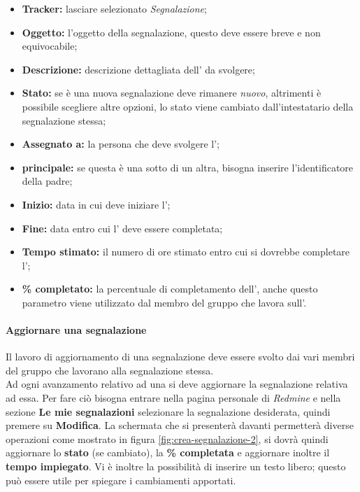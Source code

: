 \documentclass{scalatekids-article}
\begin{document}
\begin{itemize}
\item \textbf{Tracker:} lasciare selezionato \textit{Segnalazione};
\item \textbf{Oggetto:} l'oggetto della segnalazione, questo deve essere breve e non equivocabile;
\item \textbf{Descrizione:} descrizione dettagliata dell' da svolgere;
\item \textbf{Stato:} se è una nuova segnalazione deve rimanere \textit{nuovo}, altrimenti è possibile scegliere altre opzioni, lo stato viene cambiato dall'intestatario della segnalazione stessa;
\item \textbf{Assegnato a:} la persona che deve svolgere l';
\item \textbf{ principale:} se questa è una sotto  di un altra, bisogna inserire l'identificatore della  padre;
\item \textbf{Inizio:} data in cui deve iniziare l';
\item \textbf{Fine:} data entro cui l' deve essere completata;
\item \textbf{Tempo stimato:} il numero di ore stimato entro cui si dovrebbe completare l';
\item \textbf{\% completato:} la percentuale di completamento dell', anche questo parametro viene utilizzato dal membro del gruppo che lavora sull'.
\end{itemize}
\paragraph{Aggiornare una segnalazione}
Il lavoro di aggiornamento di una segnalazione deve essere svolto dai vari
membri del gruppo che lavorano alla segnalazione stessa.\\ Ad ogni avanzamento
relativo ad una  si deve aggiornare la segnalazione relativa ad
essa. Per fare ciò bisogna entrare nella pagina personale di \textit{Redmine} e
nella sezione \textbf{Le mie segnalazioni} selezionare la segnalazione
desiderata, quindi premere su \textbf{Modifica}. La schermata che si presenterà
davanti permetterà diverse operazioni come mostrato in figura
\ref{fig:crea-segnalazione-2}, si dovrà quindi aggiornare lo \textbf{stato} (se
cambiato), la \textbf{\% completata} e aggiornare inoltre il \textbf{tempo
  impiegato}. Vi è inoltre la possibilità di inserire un testo libero; questo
può essere utile per spiegare i cambiamenti apportati.
\end{document}
